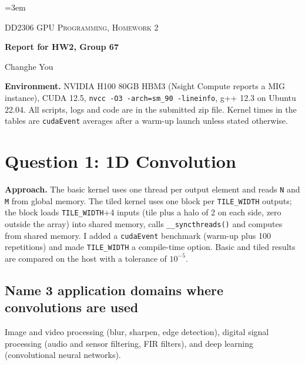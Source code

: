 \documentclass[11pt,a4paper]{article}
\begin{document}
\emergencystretch=3em

{\large\scshape DD2306 GPU Programming, Homework 2}\par\vspace{0.6em}
{\raggedright\Large\sffamily\bfseries Report for HW2, Group 67\par}
\vspace{0.8em}
{\large Changhe You}\par
\vspace{0.2em}

\textbf{Environment.} NVIDIA H100 80GB HBM3 (Nsight Compute reports a MIG instance), CUDA 12.5,
\texttt{nvcc -O3 -arch=sm\_90 -lineinfo}, g++ 12.3 on Ubuntu 22.04. All scripts, logs and code are in the
submitted zip file. Kernel times in the tables are \texttt{cudaEvent} averages after a warm-up launch unless
stated otherwise.

\section{Question 1: 1D Convolution}

\textbf{Approach.} The basic kernel uses one thread per output element and reads \texttt{N} and \texttt{M} from
global memory. The tiled kernel uses one block per \texttt{TILE\_WIDTH} outputs; the block loads
\texttt{TILE\_WIDTH}+4 inputs (tile plus a halo of 2 on each side, zero outside the array) into shared memory,
calls \texttt{\_\_syncthreads()} and computes from shared memory. I added a \texttt{cudaEvent} benchmark
(warm-up plus 100 repetitions) and made \texttt{TILE\_WIDTH} a compile-time option. Basic and tiled results are
compared on the host with a tolerance of $10^{-5}$.

\subsection{Name 3 application domains where convolutions are used}
Image and video processing (blur, sharpen, edge detection), digital signal processing (audio and sensor
filtering, FIR filters), and deep learning (convolutional neural networks).
\end{document}
